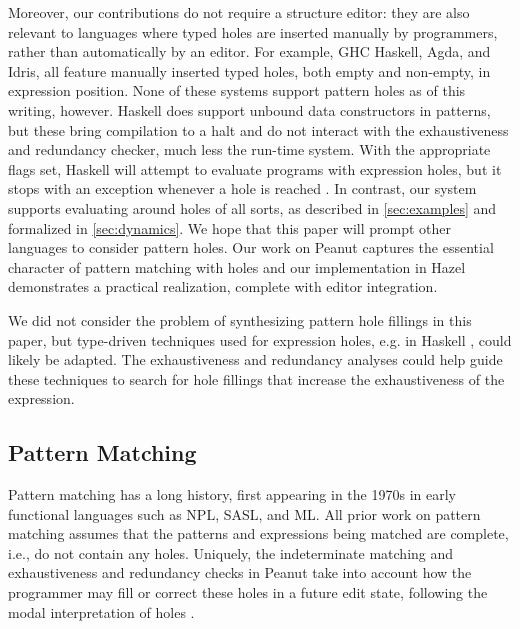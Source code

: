 Moreover, our contributions do not require a structure editor: they are also relevant to languages where typed holes are inserted 
manually by programmers, rather than automatically by an editor. 
For example, GHC Haskell, Agda, and Idris, all feature manually inserted typed holes, both empty and non-empty, in expression position. 
None of these systems support pattern holes as of this writing, however. Haskell does support unbound data constructors in patterns, but these bring compilation to a halt and do not interact with the exhaustiveness and redundancy checker, much less the run-time system. With the appropriate flags set, Haskell will attempt to evaluate programs with expression holes, but it stops with an exception whenever a hole is reached \cite{GHCHoles}. In contrast, our system supports evaluating around holes of all sorts, as described in \autoref{sec:examples} and formalized in \autoref{sec:dynamics}. We hope that this paper will prompt other languages to 
consider pattern holes. Our work on Peanut captures the essential character of pattern matching with holes and our implementation in Hazel 
demonstrates a practical realization, complete with editor integration.

We did not consider the problem of synthesizing pattern hole fillings in this paper, but type-driven techniques used for expression holes, e.g. in Haskell \cite{DBLP:conf/haskell/Gissurarson18}, could likely be adapted. The exhaustiveness and redundancy analyses could help guide these techniques to search for hole fillings that increase the exhaustiveness of the  expression.

\subsection{Pattern Matching}
Pattern matching has a long history, first appearing in the 1970s in early functional languages
such as NPL, SASL, and ML.
All prior work on pattern matching assumes that the patterns and expressions being matched are
complete, i.e., do not contain any holes.
Uniquely, the indeterminate matching and exhaustiveness and redundancy checks in Peanut
take into account how the programmer may fill or correct these holes in a future edit state,
following the modal interpretation of holes \cite{DBLP:journals/tocl/NanevskiPP08,DBLP:journals/pacmpl/OmarVCH19}.

